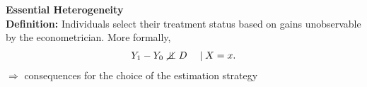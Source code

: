 \begin{frame}
	\textbf{Essential Heterogeneity}\\\vspace{0.5cm}
	\textbf{Definition:} Individuals select their treatment status based on
	gains unobservable by the econometrician. More formally,
	\begin{align*}
		Y_1 - Y_0 \notindep D\quad \mid X = x.
	\end{align*}
	\(\Rightarrow\) consequences for the choice of the estimation strategy
\end{frame}
